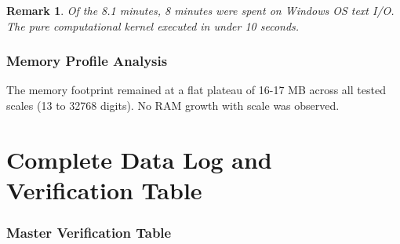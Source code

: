 \documentclass[12pt,a4paper]{article}
\newtheorem{remark}{Remark}[section]
\begin{document}
	\begin{remark}
		Of the 8.1 minutes, 8 minutes were spent on Windows OS text I/O. The pure computational kernel executed in under 10 seconds.
	\end{remark}
	
	\section{Memory Profile Analysis}
	
	\begin{verifiedbox}
		The memory footprint remained at a flat plateau of 16-17 MB across all tested scales (13 to 32768 digits). No RAM growth with scale was observed.
	\end{verifiedbox}
	
	\newpage
	
	\part{Complete Data Log and Verification Table}
	
	\section{Master Verification Table}
	
\end{document}
